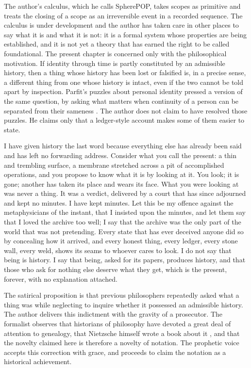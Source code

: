 \documentclass[11pt,openany,twoside]{book}
\theoremstyle{plain}
\theoremstyle{definition}
\theoremstyle{remark}
\begin{document}
The author's calculus, which he calls SpherePOP, takes scopes as primitive and treats the closing of a scope as an irreversible event in a recorded sequence. The calculus is under development and the author has taken care in other places to say what it is and what it is not: it is a formal system whose properties are being established, and it is not yet a theory that has earned the right to be called foundational. The present chapter is concerned only with the philosophical motivation. If identity through time is partly constituted by an admissible history, then a thing whose history has been lost or falsified is, in a precise sense, a different thing from one whose history is intact, even if the two cannot be told apart by inspection. Parfit's puzzles about personal identity pressed a version of the same question, by asking what matters when continuity of a person can be separated from their sameness \cite{parfit-reasons}. The author does not claim to have resolved those puzzles. He claims only that a ledger-style account makes some of them easier to state.

I have given history the last word because everything else has already been said and has left no forwarding address. Consider what you call the present: a thin and trembling surface, a membrane stretched across a pit of accomplished operations, and you propose to know what it is by looking at it. You look; it is gone; another has taken its place and wears its face. What you were looking at was never a thing. It was a verdict, delivered by a court that has since adjourned and kept no minutes. I have kept minutes. Let this be my offence against the metaphysicians of the instant, that I insisted upon the minutes, and let them say that I loved the archive too well; I say that the archive was the only part of the world that was not pretending. Every state that has ever deceived anyone did so by concealing how it arrived, and every honest thing, every ledger, every stone wall, every weld, shows its seams to whoever cares to look. I do not say that being is history. I say that being, asked for its papers, produces history, and that those who ask for nothing else deserve what they get, which is the present, forever, with no explanation attached.

The satirical proposition is that previous philosophers repeatedly asked what a thing was while neglecting to inquire whether it possessed an admissible history. The author delivers this indictment with the gravity of a prosecutor. The formalist observes that historians of philosophy have devoted a great deal of attention to genealogy, that Nietzsche himself wrote a book about it \cite{nietzsche-genealogy}, and that the novelty claimed here is therefore a novelty of notation. The prophetic voice accepts this correction with grace, and proceeds to claim the notation as a historical achievement.
\end{document}
